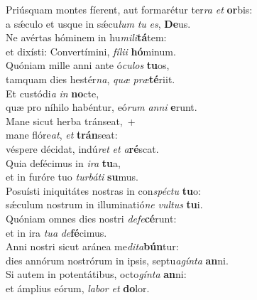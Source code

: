 \evenverse Priúsquam montes fíerent, aut formarétur ter\textit{ra} \textit{et} \textbf{or}bis:~\*\\
\evenverse a sǽculo et usque in sǽcu\textit{lum} \textit{tu} \textit{es}, \textbf{De}us.\\
\oddverse Ne avértas hóminem in hu\textit{mi}\textit{li}\textbf{tá}tem:~\*\\
\oddverse et dixísti: Convertímini, \textit{fí}\textit{li}\textit{i} \textbf{hó}minum.\\
\evenverse Quóniam mille anni ante ó\textit{cu}\textit{los} \textbf{tu}os,~\*\\
\evenverse tamquam dies hestér\textit{na}, \textit{quæ} \textit{præ}\textbf{té}riit.\\
\oddverse Et custódi\textit{a} \textit{in} \textbf{no}cte,~\*\\
\oddverse quæ pro níhilo habéntur, eó\textit{rum} \textit{an}\textit{ni} \textbf{e}runt.\\
\evenverse Mane sicut herba tránseat,~+\\
\evenverse  mane flóre\textit{at}, \textit{et} \textbf{trán}seat:~\*\\
\evenverse véspere décidat, indú\textit{ret} \textit{et} \textit{a}\textbf{ré}scat.\\
\oddverse Quia defécimus in \textit{i}\textit{ra} \textbf{tu}a,~\*\\
\oddverse et in furóre tuo \textit{tur}\textit{bá}\textit{ti} \textbf{su}mus.\\
\evenverse Posuísti iniquitátes nostras in con\textit{spé}\textit{ctu} \textbf{tu}o:~\*\\
\evenverse sǽculum nostrum in illuminatió\textit{ne} \textit{vul}\textit{tus} \textbf{tu}i.\\
\oddverse Quóniam omnes dies nostri \textit{de}\textit{fe}\textbf{cé}runt:~\*\\
\oddverse et in ira \textit{tu}\textit{a} \textit{de}\textbf{fé}cimus.\\
\evenverse Anni nostri sicut aránea me\textit{di}\textit{ta}\textbf{bún}tur:~\*\\
\evenverse dies annórum nostrórum in ipsis, septu\textit{a}\textit{gín}\textit{ta} \textbf{an}ni.\\
\oddverse Si autem in potentátibus, octo\textit{gín}\textit{ta} \textbf{an}ni:~\*\\
\oddverse et ámplius eórum, \textit{la}\textit{bor} \textit{et} \textbf{do}lor.\\
